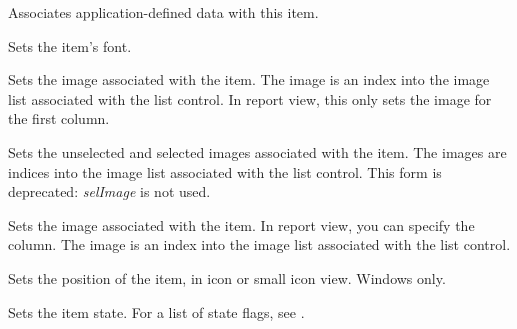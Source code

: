 \label{wxlistctrlsetitemdata}


Associates application-defined data with this item.


\label{wxlistctrlsetitemfont}


Sets the item's font.


\label{wxlistctrlsetitemimage}


Sets the image associated with the item. The image is an index into the
image list associated with the list control. In report view, this only sets
the image for the first column.


Sets the unselected and selected images associated with the item. The images are indices into the
image list associated with the list control. This form is deprecated: {\it selImage} is not
used.


\label{wxlistctrlsetitemcolumnimage}


Sets the image associated with the item. In report view, you can specify the column.
The image is an index into the image list associated with the list control.


\label{wxlistctrlsetitemposition}


Sets the position of the item, in icon or small icon view. Windows only.


\label{wxlistctrlsetitemstate}


Sets the item state. For a list of state flags, see .

